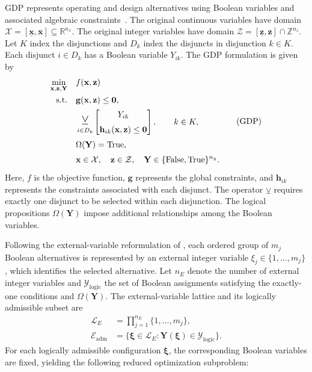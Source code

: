 \documentclass{article}
\newcommand{\bigveebar}{%
  \mathop{\mathlarger{\mathlarger{\veebar}}}\displaylimits%
}
\begin{document}
GDP represents operating and design alternatives using Boolean variables and associated algebraic constraints~\cite{raman1994modelling}. 
The original continuous variables have domain \(\mathcal X=[\underline{\mathbf x},\overline{\mathbf x}]\subseteq\mathbb R^{n_x}\). The original integer variables have domain \(\mathcal Z=[\underline{\mathbf z},\overline{\mathbf z}]\cap\mathbb Z^{n_z}\). 
Let \(K\) index the disjunctions and \(D_k\) index the disjuncts in disjunction \(k\in K\). 
Each disjunct \(i\in D_k\) has a Boolean variable \(Y_{ik}\).
The GDP formulation is given by
\begin{equation}\label{eqn:gdp.general}
\begin{aligned}
\min_{\mathbf x,\mathbf z,\mathbf Y}\quad & f(\mathbf x,\mathbf z)\\
\text{s.t.}\quad &\mathbf g(\mathbf x,\mathbf z)\leq\mathbf 0,\\
&\bigveebar_{i\in D_k}\left[
\begin{gathered}
Y_{ik}\\
\mathbf h_{ik}(\mathbf x,\mathbf z)\leq\mathbf 0
\end{gathered}\right],\qquad k\in K,\\
&\Omega(\mathbf Y)=\mathrm{True},\\
&\mathbf x\in\mathcal X,\quad\mathbf z\in\mathcal Z,\quad
\mathbf Y\in\{\mathrm{False},\mathrm{True}\}^{n_y}.
\end{aligned}\tag{GDP}
\end{equation}
Here, \(f\) is the objective function, \(\mathbf g\) represents the global constraints, and \(\mathbf h_{ik}\) represents the constraints associated with each disjunct. 
The operator \(\veebar\) requires exactly one disjunct to be selected within each disjunction. 
The logical propositions \(\Omega(\mathbf Y)\) impose additional relationships among the Boolean variables.

Following the external-variable reformulation of \textcite{ovalle2025logic}, each ordered group of \(m_j\) Boolean alternatives is represented by an external integer variable \(\xi_j\in\{1,\ldots,m_j\}\), which identifies the selected alternative.
Let \(n_E\) denote the number of external integer variables and \(\mathcal Y_{\mathrm{logic}}\) the set of Boolean assignments satisfying the exactly-one conditions and \(\Omega(\mathbf Y)\). 
The external-variable lattice and its logically admissible subset are
\begin{equation}\label{eqn:external.lattice}
\begin{aligned}
\mathcal L_E&=\prod_{j=1}^{n_E}\{1,\ldots,m_j\},\\
\mathcal E_{\mathrm{adm}}&=\{\boldsymbol\xi\in\mathcal L_E:
\mathbf Y(\boldsymbol\xi)\in\mathcal Y_{\mathrm{logic}}\}.
\end{aligned}
\end{equation}
For each logically admissible configuration $\boldsymbol\xi$, the corresponding Boolean variables are fixed, yielding the following reduced optimization subproblem:
\end{document}
